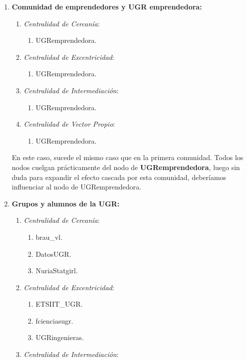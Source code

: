 \documentclass[paper=a4, fontsize=11pt]{article} %
\numberwithin{equation}{section} %
\numberwithin{figure}{section} %
\numberwithin{table}{section} %
\begin{document}
\begin{enumerate}[$\bullet$]
  \item \textbf{Comunidad de emprendedores y UGR emprendedora:}
  \begin{enumerate}[---]
    \item \textit{Centralidad de Cercanía}:
    \begin{enumerate}
      \item UGRemprendedora.
    \end{enumerate}
    \item \textit{Centralidad de Excentricidad}:
    \begin{enumerate}
      \item UGRemprendedora.
    \end{enumerate}
    \item \textit{Centralidad de Intermediación}:
    \begin{enumerate}
      \item UGRemprendedora.
    \end{enumerate}
    \item \textit{Centralidad de Vector Propio}:
    \begin{enumerate}
      \item UGRemprendedora.
    \end{enumerate}
  \end{enumerate}
  En este caso, sucede el mismo caso que en la primera comunidad. Todos los nodos cuelgan prácticamente del nodo de \textbf{UGRemprendedora}, luego sin duda para expandir el efecto cascada por esta comunidad, deberíamos influenciar al nodo de UGRemprendedora.
  \item \textbf{Grupos y alumnos de la UGR:}
  \begin{enumerate}[---]
    \item \textit{Centralidad de Cercanía}:
    \begin{enumerate}
      \item brau\_vl.
      \item DatosUGR.
      \item NuriaStatgirl.
    \end{enumerate}
    \item \textit{Centralidad de Excentricidad}:
    \begin{enumerate}
      \item ETSIIT\_UGR.
      \item fcienciasugr.
      \item UGRingenieras.
    \end{enumerate}
    \item \textit{Centralidad de Intermediación}:

\end{enumerate}
\end{enumerate}
\end{document}
